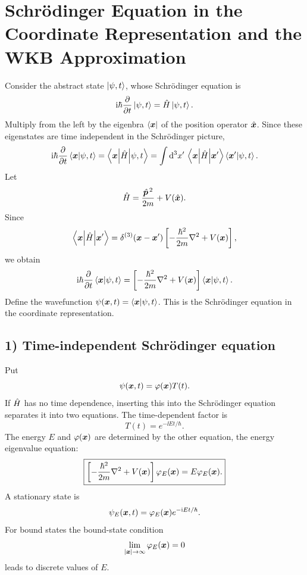 \section{Schr\"odinger Equation in the Coordinate Representation and the WKB Approximation}
Consider the abstract state $\left|\psi,t\right\rangle$, whose Schr\"odinger equation is
\begin{equation}
\mathrm{i}\hbar\frac{\partial}{\partial t}\left|\psi,t\right\rangle=\hat{H}\left|\psi,t\right\rangle.
\end{equation}
Multiply from the left by the eigenbra $\left\langle\bm{x}\right|$ of the position operator $\hat{\bm{x}}$. Since these eigenstates are time independent in the Schr\"odinger picture,
\begin{equation}
\mathrm{i}\hbar\frac{\partial}{\partial t}\left\langle\bm{x}\middle|\psi,t\right\rangle
=\left\langle\bm{x}\middle|\hat{H}\middle|\psi,t\right\rangle
=\int\mathrm{d}^3x'\,\left\langle\bm{x}\middle|\hat{H}\middle|\bm{x}'\right\rangle\left\langle\bm{x}'\middle|\psi,t\right\rangle.
\end{equation}
Let
\begin{equation}
\hat{H}=\frac{\hat{\bm{p}}^{\,2}}{2m}+V(\hat{\bm{x}}).
\end{equation}
Since
\begin{equation}
\left\langle\bm{x}\middle|\hat{H}\middle|\bm{x}'\right\rangle
=\delta^{(3)}(\bm{x}-\bm{x}')
\left[-\frac{\hbar^2}{2m}\nabla^2+V(\bm{x})\right],
\end{equation}
we obtain
\begin{equation}
\mathrm{i}\hbar\frac{\partial}{\partial t}\left\langle\bm{x}\middle|\psi,t\right\rangle
=\left[-\frac{\hbar^2}{2m}\nabla^2+V(\bm{x})\right]\left\langle\bm{x}\middle|\psi,t\right\rangle.
\end{equation}
Define the wavefunction $\psi(\bm{x},t)=\left\langle\bm{x}\middle|\psi,t\right\rangle$. This is the Schr\"odinger equation in the coordinate representation.

\subsection*{1) Time-independent Schr\"odinger equation}
Put
\begin{equation}
\psi(\bm{x},t)=\varphi(\bm{x})T(t).
\end{equation}
If $\hat{H}$ has no time dependence, inserting this into the Schr\"odinger equation separates it into two equations. The time-dependent factor is
\begin{equation}
T(t)=e^{-\ii Et/\hbar}.
\end{equation}
The energy $E$ and $\varphi(\bm{x})$ are determined by the other equation, the energy eigenvalue equation:
\begin{equation}
\boxed{\left[-\frac{\hbar^2}{2m}\nabla^2+V(\bm{x})\right]
\varphi_E(\bm{x})=E\varphi_E(\bm{x}).}
\end{equation}
A stationary state is
\begin{equation}
\psi_E(\bm{x},t)=\varphi_E(\bm{x})e^{-\mathrm{i} Et/\hbar}.
\end{equation}
For bound states the bound-state condition
\begin{equation}
\lim_{|\bm{x}|\to\infty}\varphi_E(\bm{x})=0
\end{equation}
leads to discrete values of $E$.

